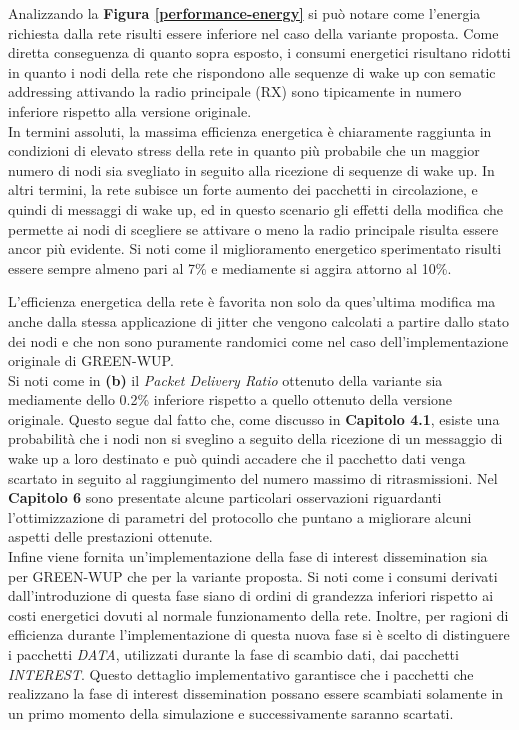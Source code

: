 \documentclass[binding=0.6cm,TFA]{sapthesis}
\begin{document}
Analizzando la \textbf{Figura \ref{performance-energy}} si può notare come l'energia richiesta dalla rete risulti essere inferiore nel caso della variante
proposta. Come diretta conseguenza di quanto sopra esposto, i consumi energetici risultano ridotti in quanto i nodi della rete che rispondono alle sequenze
di wake up con sematic addressing attivando la radio principale (RX) sono tipicamente in numero inferiore rispetto alla versione originale.\\

In termini assoluti, la massima efficienza energetica è chiaramente raggiunta in condizioni di elevato stress della rete in quanto più probabile
che un maggior numero di nodi sia svegliato in seguito alla ricezione di sequenze di wake up. In altri termini, la rete subisce un forte aumento
dei pacchetti in circolazione, e quindi di messaggi di wake up, ed in questo scenario gli effetti della modifica che permette ai nodi di
scegliere se attivare o meno la radio principale risulta essere ancor più evidente. Si noti come il miglioramento energetico sperimentato
risulti essere sempre almeno pari al 7\% e mediamente si aggira attorno al 10\%.\\

\newpage

L'efficienza energetica della rete è favorita non solo da ques'ultima modifica ma anche dalla stessa applicazione di jitter che vengono
calcolati a partire dallo stato dei nodi e che non sono puramente randomici come nel caso dell'implementazione originale di GREEN-WUP.\\

Si noti come in \textbf{(b)} il \emph{Packet Delivery Ratio} ottenuto della variante sia mediamente dello 0.2\% inferiore rispetto a quello ottenuto
della versione originale. Questo segue dal fatto che, come discusso in \textbf{Capitolo 4.1}, esiste una probabilità che i nodi non si
sveglino a seguito della ricezione di un messaggio di wake up a loro destinato e può quindi accadere che il pacchetto dati venga scartato in seguito
al raggiungimento del numero massimo di ritrasmissioni. Nel \textbf{Capitolo 6} sono presentate alcune particolari osservazioni riguardanti
l'ottimizzazione di parametri del protocollo che puntano a migliorare alcuni aspetti delle prestazioni ottenute.\\

Infine viene fornita un'implementazione della fase di interest dissemination sia per GREEN-WUP che per la variante proposta. Si noti come i consumi
derivati dall'introduzione di questa fase siano di ordini di grandezza inferiori rispetto ai costi energetici dovuti al normale funzionamento della rete.
Inoltre, per ragioni di efficienza durante l'implementazione di questa nuova fase si è scelto di distinguere i pacchetti \emph{DATA}, utilizzati
durante la fase di scambio dati, dai pacchetti \emph{INTEREST}. Questo dettaglio implementativo garantisce che i pacchetti che realizzano la
fase di interest dissemination possano essere scambiati solamente in un primo momento della simulazione e successivamente saranno scartati.\\
\end{document}
